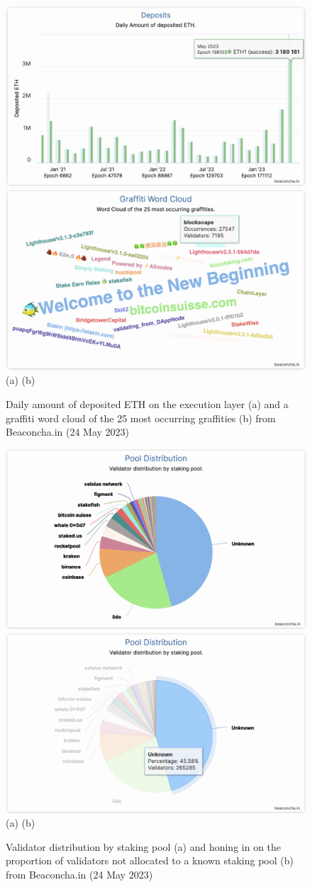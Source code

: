 \documentclass[UTF8]{article}
\begin{document}
\begin{figure}[htbp]
\begin{center}
\includegraphics[width=0.48\linewidth]{images/bchart11b}
\includegraphics[width=0.48\linewidth]{images/bchart12a} \\
(a)\hspace{160pt}        (b)\\
\caption{Daily amount of deposited ETH on the execution layer  (a) and a graffiti word cloud of the 25 most occurring graffities (b) from Beaconcha.in (24 May 2023)}
\label{fig:chart11}
\end{center}
\end{figure}

\begin{figure}[htbp]
\begin{center}
\includegraphics[width=0.48\linewidth]{images/bchart13a}
\includegraphics[width=0.48\linewidth]{images/bchart13b} \\
(a)\hspace{160pt}        (b)\\
\caption{Validator distribution by staking pool  (a) and honing in on the proportion of validators not allocated to a known staking pool  (b) from Beaconcha.in (24 May 2023)}
\label{fig:chart13a}
\end{center}
\end{figure}
\end{document}
